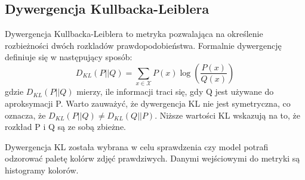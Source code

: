         \subsection{Dywergencja Kullbacka-Leiblera}
            Dywergencja Kullbacka-Leiblera to metryka pozwalająca na określenie rozbieżności dwóch rozkladów prawdopodobieństwa. 
            Formalnie dywergencję definiuje się w następujący sposób:
            \begin{equation}
                D_{KL}(P || Q) = \sum_{x \in \mathcal{X}} P(x) \log \left(\frac{P(x)}{Q(x)}\right)
            \end{equation}
            gdzie \(D_{KL}(P || Q)\) mierzy, ile informacji traci się, gdy Q jest używane do aproksymacji P. Warto zauważyć, że dywergencja KL nie jest symetryczna, co oznacza, że \(D_{KL}(P || Q) \neq D_{KL}(Q || P)\). Niższe wartości KL wskazują na to, że rozkład P i Q są ze sobą zbieżne.

            Dywergencja KL została wybrana w celu sprawdzenia czy model potrafi odzorować paletę kolórw zdjęć prawdziwych. Danymi wejściowymi do metryki są histogramy kolorów. 
            
     \section{}
            